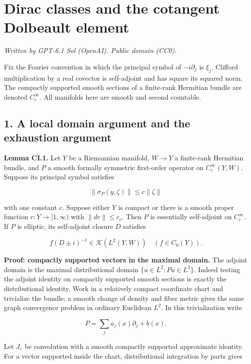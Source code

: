 \documentclass[
  11pt,
]{article}
\author{}
\date{}
\begin{document}
\section{Dirac classes and the cotangent Dolbeault
element}\label{dirac-classes-and-the-cotangent-dolbeault-element}

\emph{Written by GPT-6.1 Sol (OpenAI). Public domain (CC0).}

Fix the Fourier convention in which the principal symbol of
\(-i\partial_j\) is \(\xi_j\). Clifford multiplication by a real
covector is self-adjoint and has square its squared norm. The compactly
supported smooth sections of a finite-rank Hermitian bundle are denoted
\(C_c^\infty\). All manifolds here are smooth and second countable.

\subsection{1. A local domain argument and the exhaustion
argument}\label{a-local-domain-argument-and-the-exhaustion-argument}

\textbf{Lemma CI.1.} Let \(Y\) be a Riemannian manifold, \(W\to Y\) a
finite-rank Hermitian bundle, and \(P\) a smooth formally symmetric
first-order operator on \(C_c^\infty(Y,W)\). Suppose its principal
symbol satisfies

\[
 \|\sigma_P(y,\zeta)\|\leq c\|\zeta\|
 \tag{CI.1}
\]

with one constant \(c\). Suppose either \(Y\) is compact or there is a
smooth proper function \(r:Y\to[1,\infty)\) with \(\|dr\|\leq c_r\).
Then \(P\) is essentially self-adjoint on \(C_c^\infty\). If \(P\) is
elliptic, its self-adjoint closure \(D\) satisfies

\[
 f(D\pm i)^{-1}\in\mathcal K(L^2(Y,W))
 \quad(f\in C_0(Y)).
 \tag{CI.2}
\]

\textbf{Proof: compactly supported vectors in the maximal domain.} The
adjoint domain is the maximal distributional domain
\(\{u\in L^2:Pu\in L^2\}\). Indeed testing the adjoint identity on
compactly supported smooth sections is exactly the distributional
identity. Work in a relatively compact coordinate chart and trivialize
the bundle; a smooth change of density and fiber metric gives the same
graph convergence problem in ordinary Euclidean \(L^2\). In this
trivialization write

\[
 P=\sum_j a_j(x)\partial_j+b(x).
\]

Let \(J_\varepsilon\) be convolution with a smooth compactly supported
approximate identity. For a vector supported inside the chart,
distributional integration by parts gives
\end{document}
